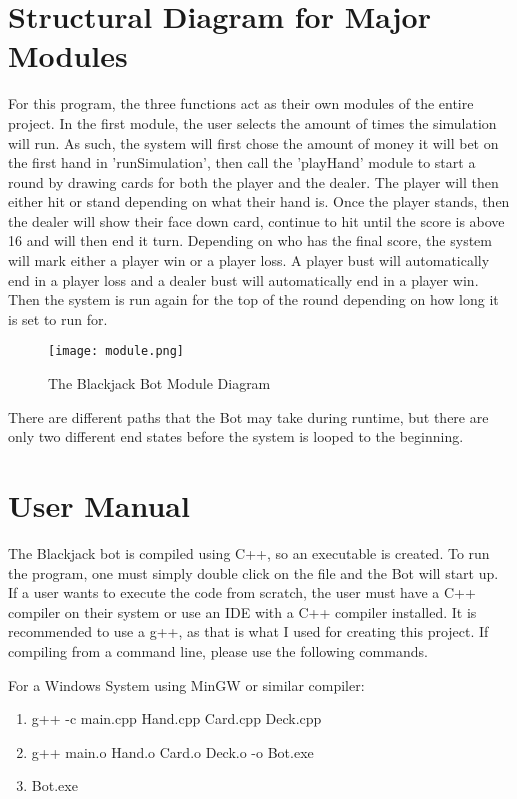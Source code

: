 {{{\section{Structural Diagram for Major Modules}
For this program, the three functions act as their own modules of the entire project. In the first module, the user selects the amount of times the simulation will run. As such, the system will first chose the amount of money it will bet on the first hand in 'runSimulation', then call the 'playHand' module to start a round by drawing cards for both the player and the dealer. The player will then either hit or stand depending on what their hand is. Once the player stands, then the dealer will show their face down card, continue to hit until the score is above 16 and will then end it turn. Depending on who has the final score, the system will mark either a player win or a player loss. A player bust will automatically end in a player loss and a dealer bust will automatically end in a player win. Then the system is run again for the top of the round depending on how long it is set to run for.
\begin{figure}[H]
	\centering
	\texttt{[image: module.png]}\\
	\caption{The Blackjack Bot Module Diagram}
	\label{fig:tobias}
\end{figure}

There are different paths that the Bot may take during runtime, but there are only two different end states before the system is looped to the beginning.

\section{User Manual}
The Blackjack bot is compiled using C++, so an executable is created. To run the program, one must simply double click on the file and the Bot will start up. If a user wants to execute the code from scratch, the user must have a C++ compiler on their system or use an IDE with a C++ compiler installed. It is recommended to use a g++, as that is what I used for creating this project. If compiling from a command line, please use the following commands.
\newline
{\setlength{\parindent}{0cm}
\newline
For a Windows System using MinGW or similar compiler:
\begin{enumerate}
	\item g++ -c main.cpp Hand.cpp Card.cpp Deck.cpp
	\item g++ main.o Hand.o Card.o Deck.o -o Bot.exe
	\item Bot.exe
\end{enumerate}

}}}}
